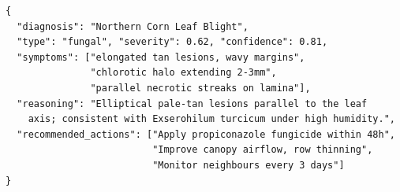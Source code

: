 \documentclass[runningheads]{llncs}
\begin{document}
\begin{lstlisting}
{
  "diagnosis": "Northern Corn Leaf Blight",
  "type": "fungal", "severity": 0.62, "confidence": 0.81,
  "symptoms": ["elongated tan lesions, wavy margins",
               "chlorotic halo extending 2-3mm",
               "parallel necrotic streaks on lamina"],
  "reasoning": "Elliptical pale-tan lesions parallel to the leaf
    axis; consistent with Exserohilum turcicum under high humidity.",
  "recommended_actions": ["Apply propiconazole fungicide within 48h",
                          "Improve canopy airflow, row thinning",
                          "Monitor neighbours every 3 days"]
}
\end{lstlisting}




\end{document}
